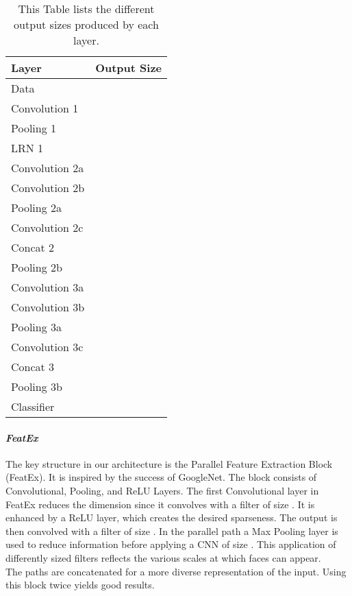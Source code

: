 \documentclass[10pt,journal,compsoc, hidelinks]{IEEEtran}
\newcommand{\paraV}{\vspace{1em}}
\begin{document}
\begin{table}[ht!]
\centering
\caption{This Table lists the different output sizes produced by each layer.}
\label{tab:layers}

\begin{tabular}{l|l}
\hline
Layer & Output Size \\
\hline
Data & \\
Convolution 1 & \\
Pooling 1 &  \\
LRN 1 & \\
\hline

Convolution 2a & \\
Convolution 2b & \\
Pooling 2a & \\
Convolution 2c & \\
Concat 2 & \\
Pooling 2b & \\
\hline

Convolution 3a & \\
Convolution 3b & \\
Pooling 3a & \\
Convolution 3c & \\
Concat 3 & \\
Pooling 3b & \\
\hline

Classifier & \\
\hline
\end{tabular}
\end{table}

\paraV
\paragraph{\textit{FeatEx}}
The key structure in our architecture is the Parallel Feature Extraction Block (FeatEx). It is inspired by the success of GoogleNet. The block consists of Convolutional, Pooling, and ReLU Layers. The first Convolutional layer in FeatEx reduces the dimension since it convolves with a filter of size . It is enhanced by a ReLU layer, which creates the desired sparseness. The output is then convolved with a filter of size . In the parallel path a Max Pooling layer is used to reduce information before applying a CNN of size . This application of differently sized filters reflects the various scales at which faces can appear.\\
The paths are concatenated for a more diverse representation of the input. Using this block twice yields good results.\\
\end{document}

